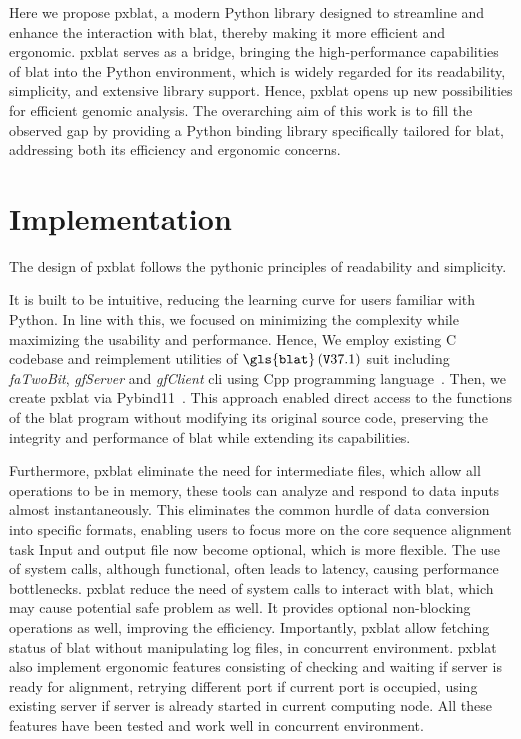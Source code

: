 Here we propose \gls{pxblat}, a modern Python library designed to streamline and enhance the interaction with \gls{blat}, thereby making it more efficient and ergonomic.
\gls{pxblat} serves as a bridge, bringing the high-performance capabilities of \gls{blat}  into the Python environment, which is widely regarded for its readability, simplicity, and extensive library support.
Hence, \gls{pxblat} opens up new possibilities for efficient genomic analysis.
The overarching aim of this work is to fill the observed gap by providing a Python binding library specifically tailored for \gls{blat}, addressing both its efficiency and ergonomic concerns.

\section*{Implementation}\label{sec:implementation}


The design of \gls{pxblat} follows the pythonic principles of readability and simplicity.

It is built to be intuitive, reducing the learning curve for users familiar with Python.
In line with this, we focused on minimizing the complexity while maximizing the usability and performance.
Hence, We employ existing C codebase and reimplement utilities of \(\mathtt{\gls{blat}}\left(\mathtt{V}37.1\right)\) suit  including \emph{faTwoBit}, \emph{gfServer} and \emph{gfClient} \gls{cli} using Cpp programming language~\citep{kent2002blat}.
Then, we create \gls{pxblat} via Pybind11~\citep{pybind11}.
This approach enabled direct access to the functions of the \gls{blat} program without modifying its original source code, preserving the integrity and performance of \gls{blat} while extending its capabilities.

Furthermore, \gls{pxblat} eliminate the need for intermediate files, which allow all operations to be in memory, these tools can analyze and respond to data inputs almost instantaneously.
This eliminates the common hurdle of data conversion into specific formats, enabling users to focus more on the core sequence alignment task
Input and output file now become optional, which is more flexible.
The use of system calls, although functional, often leads to latency, causing performance bottlenecks.
\gls{pxblat} reduce the need of system calls to interact with \gls{blat}, which may cause potential safe problem as well.
It provides optional non-blocking operations as well, improving the efficiency.
Importantly, \gls{pxblat} allow fetching status of \gls{blat} without manipulating log files, in concurrent environment.
\gls{pxblat} also implement ergonomic features consisting of checking and waiting if server is ready for alignment, retrying different port if current port is occupied, using existing server if server is already started in current computing node.
All these features have been tested and work well in concurrent environment.

